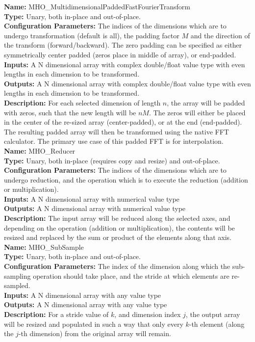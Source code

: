 \noindent \textbf{Name:} MHO\_MultidimensionalPaddedFastFourierTransform \\
\textbf{Type:} Unary, both in-place and out-of-place. \\
\textbf{Configuration Parameters:} The indices of the dimensions which are to undergo transformation (default is all),
the padding factor $M$ and the direction of the transform (forward/backward). The zero padding can be specified as either symmetrically center padded (zeros place in middle of array), or end-padded.\\
\textbf{Inputs:} A N dimensional array with complex double/float value type with even lengths in each dimension to be transformed. \\
\textbf{Outputs:} A N dimensional array with complex double/float value type with even lengths in each dimension to be transformed.\\
\textbf{Description:} For each selected dimension of length $n$, the array will be padded with zeros, such that the new length will be $nM$. The zeros will either be placed in the center of the re-sized array (center-padded), or at the end (end-padded). The resulting padded array will then be transformed using the native FFT calculator. The primary use case of this padded FFT is for interpolation.\\


\noindent \textbf{Name:} MHO\_Reducer  \\
\textbf{Type:} Unary, both in-place (requires copy and resize) and out-of-place. \\
\textbf{Configuration Parameters:} The indices of the dimensions which are to undergo reduction, and the operation which is to execute the reduction (addition or multiplication). \\
\textbf{Inputs:} A N dimensional array with numerical value type\\
\textbf{Outputs:} A N dimensional array with numerical value type\\
\textbf{Description:} The input array will be reduced along the selected axes, and depending on the operation (addition or multiplication), the contents will be resized and replaced by the sum or product of the elements along that axis.\\

\noindent \textbf{Name:} MHO\_SubSample  \\
\textbf{Type:} Unary, both in-place and out-of-place. \\
\textbf{Configuration Parameters:} The index of the dimension along which the sub-sampling operation should take place, and the stride at which elements are re-sampled.\\
\textbf{Inputs:} A N dimensional array with any value type\\
\textbf{Outputs:} A N dimensional array with any value type\\
\textbf{Description:} For a stride value of $k$, and dimension index $j$, the output array will be resized and populated in such a way that only every $k$-th element (along the $j$-th dimension) from the original array will remain.\\



